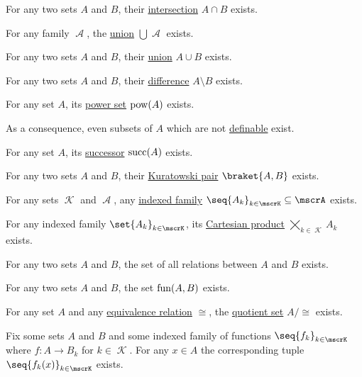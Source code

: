 \begin{proposition}
\begin{thmenum}
     For any two sets \( A \) and \( B \), their \hyperref[def:basic_set_operations/intersection]{intersection} \( A \cap B \) exists.

     For any family \( \mscrA \), the \hyperref[def:basic_set_operations/union]{union} \( \bigcup \mscrA \) exists.

     For any two sets \( A \) and \( B \), their \hyperref[def:basic_set_operations/union]{union} \( A \cup B \) exists.

     For any two sets \( A \) and \( B \), their \hyperref[def:basic_set_operations/difference]{difference} \( A \setminus B \) exists.

     For any set \( A \), its \hyperref[def:basic_set_operations/power_set]{power set} \( \operatorname{pow}(A) \) exists.

    As a consequence, even subsets of \( A \) which are not \hyperref[def:first_order_definability]{definable} exist.

     For any set \( A \), its \hyperref[def:ordinal_successor]{successor} \( \operatorname{succ}(A) \) exists.

     For any two sets \( A \) and \( B \), their \hyperref[def:tuple_and_cartesian_product/kuratowski_pair]{Kuratowski pair} \( \braket{ A, B } \) exists.

     For any sets \( \mscrK \) and \( \mscrA \), any \hyperref[def:tuple_and_cartesian_product/indexed_family]{indexed family} \( \seq{ A_k }_{k \in \mscrK} \subseteq \mscrA \) exists.

     For any indexed family \( \set{ A_k }_{k \in \mscrK} \), its \hyperref[def:tuple_and_cartesian_product]{Cartesian product} \( \bigtimes_{k \in \mscrK} A_k \) exists.

     For any two sets \( A \) and \( B \), the set of all relations between \( A \) and \( B \) exists.

     For any two sets \( A \) and \( B \), the set \hyperref[def:function/set_of_functions]{\( \operatorname{fun}(A, B) \)} exists.

     For any set \( A \) and any \hyperref[def:equivalence_relation]{equivalence relation} \( \cong \), the \hyperref[def:equivalence_relation/quotient]{quotient set} \( A / {\cong} \) exists.

     Fix some sets \( A \) and \( B \) and some indexed family of functions \( \seq{ f_k }_{k \in \mscrK} \) where \( f: A \to B_k \) for \( k \in \mscrK \). For any \( x \in A \) the corresponding tuple \( \seq{ f_k(x) }_{k \in \mscrK} \) exists.
  \end{thmenum}
\end{proposition}
